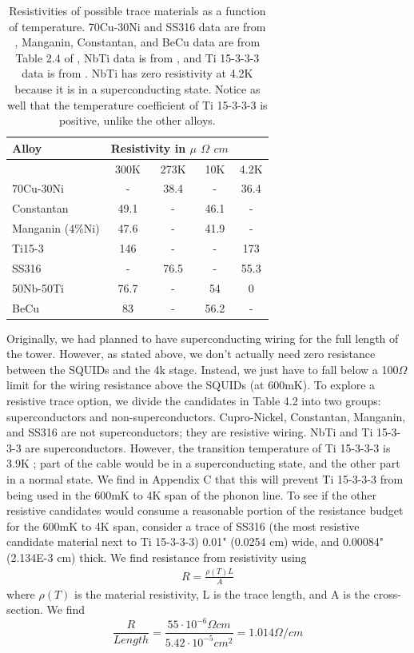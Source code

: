 \documentclass{report}
\begin{document}
\begin{table}[h]
\centering
\begin{threeparttable}
\begin{tabular}{l|c|c|c|c}
Alloy & \multicolumn{3}{c}{Resistivity in $\mu$ $\Omega$ $cm$} \\\toprule
 & 300K & 273K & 10K & 4.2K \\\midrule
70Cu-30Ni & - & 38.4 & - & 36.4 \\
Constantan & 49.1 & - & 46.1 & - \\
Manganin (4\%Ni) & 47.6 & - & 41.9 & - \\
Ti15-3 & 146 & - & - & 173 \\
SS316 & - & 76.5 & - & 55.3 \\
50Nb-50Ti & 76.7 & - & 54 & 0 \\
BeCu & 83 & - & 56.2 & - \\
\end{tabular}
\end{threeparttable}
\caption{Resistivities of possible trace materials as a function of temperature. 70Cu-30Ni and SS316 data are from \cite{Clark1970}, Manganin, Constantan, and BeCu data are from Table 2.4 of \cite{Sciver1986}, NbTi data is from \cite{byc}, and Ti 15-3-3-3 data is from \cite{wik}. NbTi has zero resistivity at 4.2K because it is in a superconducting state. Notice as well that the temperature coefficient of Ti 15-3-3-3 is positive, unlike the other alloys.}
\end{table}

Originally, we had planned to have superconducting wiring for the full length of the tower. However, as stated above, we don't actually need zero resistance between the SQUIDs and the 4k stage. Instead, we just have to fall below a 100$\Omega$ limit for the wiring resistance above the SQUIDs (at 600mK). To explore a resistive trace option, we divide the candidates in Table 4.2 into two groups: superconductors and non-superconductors. Cupro-Nickel, Constantan, Manganin, and SS316 are not superconductors; they are resistive wiring. NbTi and Ti 15-3-3-3 are superconductors. However, the transition temperature of Ti 15-3-3-3 is 3.9K \cite{wik}; part of the cable would be in a superconducting state, and the other part in a normal state. We find in Appendix C that this will prevent Ti 15-3-3-3 from being used in the 600mK to 4K span of the phonon line. To see if the other resistive candidates would consume a reasonable portion of the resistance budget for the 600mK to 4K span, consider a trace of SS316 (the most resistive candidate material next to Ti 15-3-3-3) 0.01" (0.0254 cm) wide, and 0.00084" (2.134E-3 cm) thick. We find resistance from resistivity using
\begin{eqnarray}
R = \frac{\rho(T) L}{A}
\end{eqnarray}
where $\rho(T)$ is the material resistivity, L is the trace length, and A is the cross-section. We find
$$
\frac{R}{Length} = \frac{55 \cdot 10^{-6} \Omega cm}{5.42 \cdot 10^{-5} cm^{2}} = 1.014 \Omega / cm
$$
\end{document}

